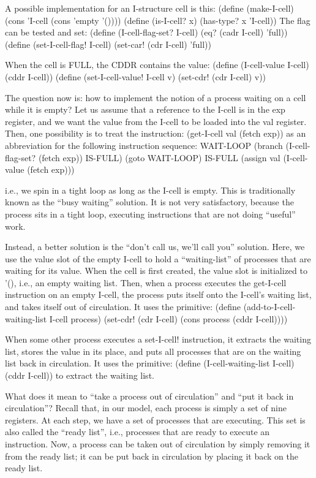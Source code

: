 A possible implementation for an I-structure cell is this:
\beginlisp
(define (make-I-cell) (cons 'I-cell (cons 'empty '())))
\null
(define (is-I-cell? x) (has-type? x 'I-cell))
\endlisp
The flag can be tested and set:
\beginlisp
(define (I-cell-flag-set? I-cell) (eq? (cadr I-cell) 'full))
\null
(define (set-I-cell-flag! I-cell) (set-car! (cdr I-cell) 'full))
\endlisp

When the cell is FULL, the CDDR contains the value:
\beginlisp
(define (I-cell-value I-cell) (cddr I-cell))
\null
(define (set-I-cell-value! I-cell v)
  (set-cdr! (cdr I-cell) v))
\endlisp

The question now is: how to implement the notion of a process waiting
on a cell while it is empty?  Let us assume that a reference to the
I-cell is in the {\cf exp} register, and we want the value from the
I-cell to be loaded into the {\cf val} register.
Then, one possibility is to treat the instruction:
\beginlisp
(get-I-cell val (fetch exp))
\endlisp
as an abbreviation for the following instruction sequence:
\beginlisp
WAIT-LOOP
  (branch (I-cell-flag-set? (fetch exp)) IS-FULL)
  (goto WAIT-LOOP)
IS-FULL
  (assign val (I-cell-value (fetch exp)))
\endlisp

i.e., we spin in a tight loop as long as the I-cell is empty.  This is
traditionally known as the ``busy waiting'' solution.  It is not very
satisfactory, because the process sits in a tight loop, executing
instructions that are not doing ``useful'' work.

Instead, a better solution is the ``don't call us,
we'll call you'' solution.  Here, we use the value slot of the empty
I-cell to hold a ``waiting-list'' of processes that are waiting for
its value.  When the cell is first created, the value slot is
initialized to {\cf '()}, i.e., an empty waiting list.  Then, when a
process executes the {\cf get-I-cell} instruction on an empty I-cell,
the process puts itself onto the I-cell's waiting list, and takes
itself out of circulation. It uses the primitive:
\beginlisp
(define (add-to-I-cell-waiting-list I-cell process)
  (set-cdr! (cdr I-cell) (cons process (cddr I-cell))))
\endlisp

When some other process executes a {\cf
set-I-cell!} instruction, it extracts the waiting list, stores the
value in its place, and puts all processes that are on the waiting
list back in circulation.  It uses the primitive:
\beginlisp
(define (I-cell-waiting-list I-cell) (cddr I-cell))
\endlisp
to extract the waiting list.

What does it mean to ``take a process out of circulation'' and ``put
it back in circulation''?  Recall that, in our model, each process is
simply a set of nine registers.  At each step, we have a set of
processes that are executing.  This set is also called the ``ready
list'', i.e., processes that are ready to execute an instruction.
Now, a process can be taken out of circulation by simply removing it
from the ready list; it can be put back in circulation by placing it
back on the ready list.

